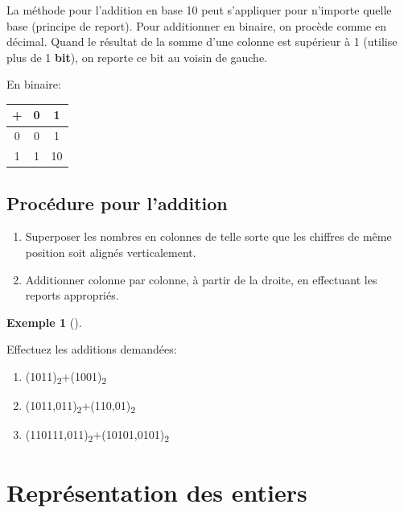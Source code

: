 \documentclass[
  letterpaper,
]{scrbook}
\providecommand{\tightlist}{%
  \setlength{\itemsep}{0pt}\setlength{\parskip}{0pt}}\usepackage{longtable,booktabs,array}
\theoremstyle{definition}
\newtheorem{example}{Exemple}[chapter]
\theoremstyle{definition}
\theoremstyle{plain}
\theoremstyle{remark}
\begin{document}
La méthode pour l'addition en base 10 peut s'appliquer pour n'importe
quelle base (principe de report). Pour additionner en binaire, on
procède comme en décimal. Quand le résultat de la somme d'une colonne
est supérieur à 1 (utilise plus de 1 \textbf{bit}), on reporte ce bit au
voisin de gauche.

En binaire:

\begin{longtable}[]{@{}ccc@{}}
\toprule()
+ & 0 & 1 \\
\midrule()
\endhead
0 & 0 & 1 \\
1 & 1 & 10 \\
\bottomrule()
\end{longtable}

\hypertarget{procuxe9dure-pour-laddition}{%
\subsection*{Procédure pour
l'addition}\label{procuxe9dure-pour-laddition}}

\begin{enumerate}
\def\labelenumi{\arabic{enumi}.}
\tightlist
\item
  Superposer les nombres en colonnes de telle sorte que les chiffres de
  même position soit alignés verticalement.
\item
  Additionner colonne par colonne, à partir de la droite, en effectuant
  les reports appropriés.
\end{enumerate}

\leavevmode{}%
\begin{example}[]\label{exm-addition-binaire}

Effectuez les additions demandées:

\begin{enumerate}
\def\labelenumi{\alph{enumi})}
\tightlist
\item
  (1011)\textsubscript{2}+(1001)\textsubscript{2}
\item
  (1011,011)\textsubscript{2}+(110,01)\textsubscript{2}
\item
  (110111,011)\textsubscript{2}+(10101,0101)\textsubscript{2}
\end{enumerate}

\end{example}

\hypertarget{repruxe9sentation-des-entiers}{%
\section{Représentation des
entiers}\label{repruxe9sentation-des-entiers}}
\end{document}
